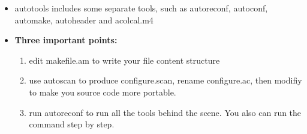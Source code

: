 \documentclass[a4paper,11pt,twoside]{book}
\begin{document}
\begin{itemize}
		\item autotools includes some separate tools, such as autoreconf, autoconf, automake, autoheader and acolcal.m4 
		
		\item \textbf{Three important points:}
				\begin{enumerate}
						\item edit makefile.am to write your file content structure
						\item use autoscan to produce configure.scan, rename configure.ac, then modifiy to make you source code more portable. 
						
						\item run autoreconf to run all the tools behind the scene. You also can run the command step by step.
				\end{enumerate}
		

\end{itemize}
\end{document}
